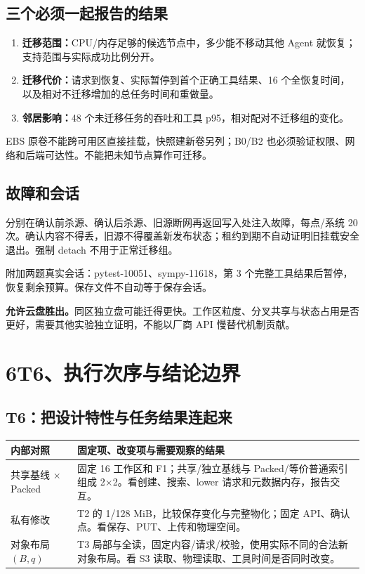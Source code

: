 \documentclass[UTF8,11pt,a4paper,fontset=windows]{ctexart}
\begin{document}
\subsection*{三个必须一起报告的结果}
\begin{enumerate}
\item \textbf{迁移范围：}CPU/内存足够的候选节点中，多少能不移动其他 Agent 就恢复；支持范围与实际成功比例分开。
\item \textbf{迁移代价：}请求到恢复、实际暂停到首个正确工具结果、16 个全恢复时间，以及相对不迁移增加的总任务时间和重做量。
\item \textbf{邻居影响：}48 个未迁移任务的吞吐和工具 p95，相对配对不迁移组的变化。
\end{enumerate}

EBS 原卷不能跨可用区直接挂载，快照建新卷另列；B0/B2 也必须验证权限、网络和后端可达性。不能把未知节点算作可迁移。

\subsection*{故障和会话}
分别在确认前杀源、确认后杀源、旧源断网再返回写入处注入故障，每点/系统 20 次。确认内容不得丢，旧源不得覆盖新发布状态；租约到期不自动证明旧挂载安全退出。强制 detach 不用于正常迁移组。

附加两题真实会话：pytest-10051、sympy-11618，第 3 个完整工具结果后暂停，恢复剩余预算。保存文件不自动等于保存会话。

\textbf{允许云盘胜出。}同区独立盘可能迁得更快。工作区粒度、分叉共享与状态占用是否更好，需要其他实验独立证明，不能以厂商 API 慢替代机制贡献。
\newpage

\section*{6\quad T6、执行次序与结论边界}
\subsection*{T6：把设计特性与任务结果连起来}
{\small\begin{tabularx}{\linewidth}{@{}P{31mm}Y@{}}
\toprule
内部对照 & 固定项、改变项与需要观察的结果\\
\midrule
共享基线 $\times$ Packed & 固定 16 工作区和 F1；共享/独立基线与 Packed/等价普通索引组成 2$\times$2。看创建、搜索、lower 请求和元数据内存，报告交互。\\
私有修改 & T2 的 1/128 MiB，比较保存变化与完整物化；固定 API、确认点。看保存、PUT、上传和物理空间。\\
对象布局 $(B,q)$ & T3 局部与全读，固定内容/请求/校验，使用实际不同的合法新对象布局。看 S3 读取、物理读取、工具时间是否同时改变。\\
\bottomrule
\end{tabularx}}
\end{document}
